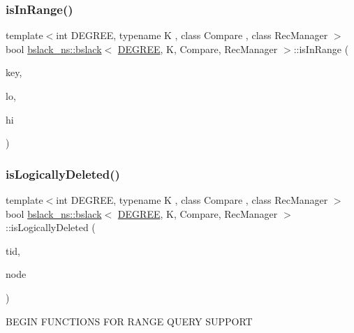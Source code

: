 \subsubsection{\texorpdfstring{is\+In\+Range()}{isInRange()}}
{\footnotesize\ttfamily template$<$int D\+E\+G\+R\+EE, typename K , class Compare , class Rec\+Manager $>$ \\
bool \hyperlink{classbslack__ns_1_1bslack}{bslack\+\_\+ns\+::bslack}$<$ \hyperlink{brown__sigouin__abtree__kcas_2adapter_8h_a5d88b17d70c985f2f2b8e987037fd6dd}{D\+E\+G\+R\+EE}, K, Compare, Rec\+Manager $>$\+::is\+In\+Range (\begin{DoxyParamCaption}\item[{const K \&}]{key,  }\item[{const K \&}]{lo,  }\item[{const K \&}]{hi }\end{DoxyParamCaption})\hspace{0.3cm}{\ttfamily [inline]}}

\mbox{\label{classbslack__ns_1_1bslack_acd41bfa32bac64fb54fd6c69a9a1f2f4}} 
\subsubsection{\texorpdfstring{is\+Logically\+Deleted()}{isLogicallyDeleted()}}
{\footnotesize\ttfamily template$<$int D\+E\+G\+R\+EE, typename K , class Compare , class Rec\+Manager $>$ \\
bool \hyperlink{classbslack__ns_1_1bslack}{bslack\+\_\+ns\+::bslack}$<$ \hyperlink{brown__sigouin__abtree__kcas_2adapter_8h_a5d88b17d70c985f2f2b8e987037fd6dd}{D\+E\+G\+R\+EE}, K, Compare, Rec\+Manager $>$\+::is\+Logically\+Deleted (\begin{DoxyParamCaption}\item[{const int}]{tid,  }\item[{\hyperlink{structbslack__ns_1_1Node}{Node}$<$ \hyperlink{brown__sigouin__abtree__kcas_2adapter_8h_a5d88b17d70c985f2f2b8e987037fd6dd}{D\+E\+G\+R\+EE}, K $>$ $\ast$}]{node }\end{DoxyParamCaption})\hspace{0.3cm}{\ttfamily [inline]}}

B\+E\+G\+IN F\+U\+N\+C\+T\+I\+O\+NS F\+OR R\+A\+N\+GE Q\+U\+E\+RY S\+U\+P\+P\+O\+RT \mbox{\label{classbslack__ns_1_1bslack_a3fd1c73afd843d6207dad1ff692f2fd7}} 
